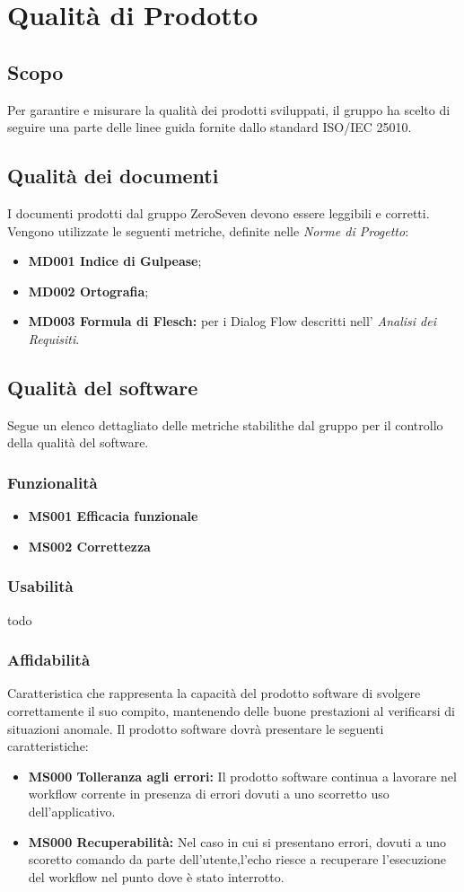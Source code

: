 \chapter{Qualità di Prodotto}
\section{Scopo}
Per garantire e misurare la qualità dei prodotti sviluppati, il gruppo ha scelto di seguire una parte delle linee guida fornite dallo standard ISO/IEC 25010.
\section{Qualità dei documenti}
I documenti prodotti dal gruppo ZeroSeven devono essere leggibili e corretti. Vengono utilizzate le seguenti metriche, definite nelle \textit{Norme di Progetto}:
\begin{itemize}
    \item \textbf{MD001 Indice di Gulpease};
    \item \textbf{MD002 Ortografia};
    \item \textbf{MD003 Formula di Flesch:} per i Dialog Flow descritti nell' \textit{Analisi dei Requisiti}.
\end{itemize}
\section{Qualità del software}
Segue un elenco dettagliato delle metriche stabilithe dal gruppo per il controllo della qualità del software.

\subsection{Funzionalità}
\begin{itemize}
	\item \textbf{MS001 Efficacia funzionale}
	\item \textbf{MS002 Correttezza}
\end{itemize}
\subsection{Usabilità}
todo
\subsection{Affidabilità}
Caratteristica che rappresenta la capacità del prodotto software di svolgere correttamente il suo compito, mantenendo delle buone prestazioni al verificarsi di situazioni anomale. 
Il prodotto software dovrà presentare le seguenti caratteristiche:
 \begin{itemize}
	\item \textbf{MS000 Tolleranza agli errori:} Il prodotto software continua a lavorare nel workflow corrente in presenza di errori dovuti a uno scorretto uso dell'applicativo.
	\item \textbf{MS000 Recuperabilità:} Nel caso in cui si presentano errori, dovuti a uno scoretto comando da parte dell'utente,l'echo riesce a recuperare l'esecuzione  del workflow nel punto dove è stato interrotto.
\end{itemize}
